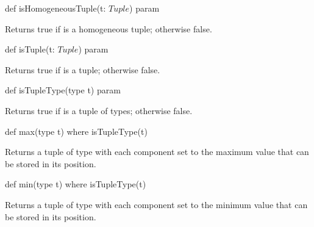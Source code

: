 \begin{protohead}
def isHomogeneousTuple(t: $Tuple$) param
\end{protohead}
\begin{protobody}
Returns true if  is a homogeneous tuple; otherwise false.
\end{protobody}

\begin{protohead}
def isTuple(t: $Tuple$) param
\end{protohead}
\begin{protobody}
Returns true if  is a tuple; otherwise false.
\end{protobody}

\begin{protohead}
def isTupleType(type t) param
\end{protohead}
\begin{protobody}
Returns true if  is a tuple of types; otherwise false.
\end{protobody}

\begin{protohead}
def max(type t) where isTupleType(t)
\end{protohead}
\begin{protobody}
Returns a tuple of type  with each component set to the maximum
value that can be stored in its position.
\end{protobody}

\begin{protohead}
def min(type t) where isTupleType(t)
\end{protohead}
\begin{protobody}
Returns a tuple of type  with each component set to the minimum
value that can be stored in its position.
\end{protobody}

